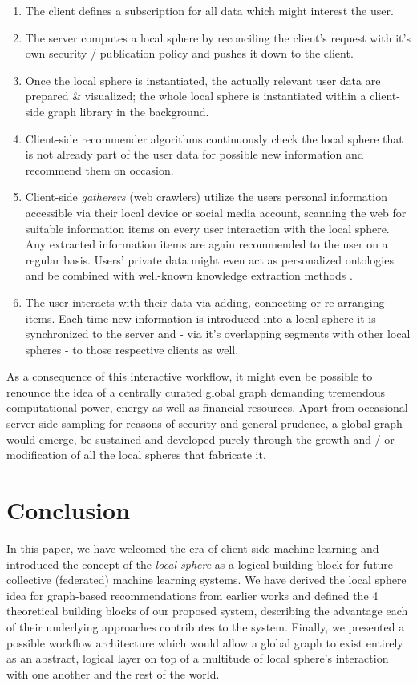 \documentclass{llncs}
\begin{document}
\begin{enumerate}
	\item The client defines a subscription for all data which might interest the user.
	\item The server computes a local sphere by reconciling the client's request with it's own security / publication policy and pushes it down to the client.
	\item Once the local sphere is instantiated, the actually relevant user data are prepared \& visualized; the whole local sphere is instantiated within a client-side graph library in the background.
	\item Client-side recommender algorithms continuously check the local sphere that is not already part of the user data for possible new information and recommend them on occasion.
	\item Client-side \textit{gatherers} (web crawlers) utilize the users personal information accessible via their local device or social media account, scanning the web for suitable information items on every user interaction with the local sphere. Any extracted information items are again recommended to the user on a regular basis. Users' private data might even act as personalized ontologies and be combined with well-known knowledge extraction methods \cite{2003automaticKEfromWebDocuments}.
	\item The user interacts with their data via adding, connecting or re-arranging items. Each time new information is introduced into a local sphere it is synchronized to the server and - via it's overlapping segments with other local spheres - to those respective clients as well.
\end{enumerate}

As a consequence of this interactive workflow, it might even be possible to renounce the idea of a centrally curated global graph demanding tremendous computational power, energy as well as financial resources. Apart from occasional server-side sampling for reasons of security and general prudence, a global graph would emerge, be sustained and developed purely through the growth and / or modification of all the local spheres that fabricate it.


\section{Conclusion}
\label{sect:conclusion}

In this paper, we have welcomed the era of client-side machine learning and introduced the concept of the \textit{local sphere} as a logical building block for future collective (federated) machine learning systems. We have derived the local sphere idea for graph-based recommendations from earlier works and defined the 4 theoretical building blocks of our proposed system, describing the advantage each of their underlying approaches contributes to the system. Finally, we presented a possible workflow architecture which would allow a global graph to exist entirely as an abstract, logical layer on top of a multitude of local sphere's interaction with one another and the rest of the world.

\newpage



\end{document}
